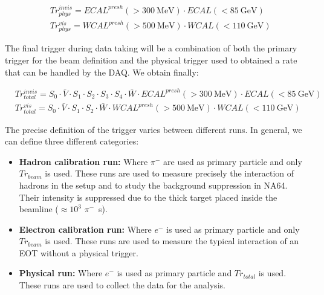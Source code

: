 \begin{equation}
\label{eq:trigger-phys}
\begin{split}
& Tr^{invis}_{phys} = ECAL^{presh}(> \SI{300}{\mega\electronvolt}) \cdot ECAL(<\SI{85}{\giga\electronvolt})\\
& Tr^{vis}_{phys} = WCAL^{presh}(>\SI{500}{\mega\electronvolt}) \cdot WCAL(<\SI{110}{\giga\electronvolt})
\end{split}
\end{equation}

The final trigger during data taking will be a combination of both the primary trigger for the beam definition and the physical trigger used to obtained a rate that can be handled by the DAQ. We obtain finally:

\begin{equation}
\label{eq:trigger-total}
\begin{split}
& Tr^{invis}_{total} = S_0 \cdot \bar{V} \cdot S_1 \cdot S_2 \cdot S_3 \cdot S_4 \cdot \bar{W} \cdot ECAL^{presh}(> \SI{300}{\mega\electronvolt}) \cdot ECAL(<\SI{85}{\giga\electronvolt})\\
& Tr^{vis}_{total} = S_0 \cdot \bar{V} \cdot S_1 \cdot S_2\cdot \bar{W} \cdot WCAL^{presh}(>\SI{500}{\mega\electronvolt}) \cdot WCAL(<\SI{110}{\giga\electronvolt})
\end{split}
\end{equation}

The precise definition of the trigger varies between different runs. In general, we can define three different categories:

\begin{itemize}
\item \textbf{Hadron calibration run:} Where $\pi^-$ are used as primary particle and only $Tr_{beam}$ is used. These runs are used to measure precisely the interaction of hadrons in the setup and to study the background suppression in NA64. Their intensity is suppressed due to the thick target placed inside the beamline ($\approx 10^{3}$ $\pi^-$\si{\per\second}).
\item \textbf{Electron calibration run:} Where $e^-$ is used as primary particle and only $Tr_{beam}$ is used. These runs are used to measure the typical interaction of an EOT without a physical trigger. 
\item \textbf{Physical run:} Where $e^-$ is used as primary particle and $Tr_{total}$ is used. These runs are used to collect the data for the analysis. 
\end{itemize}

